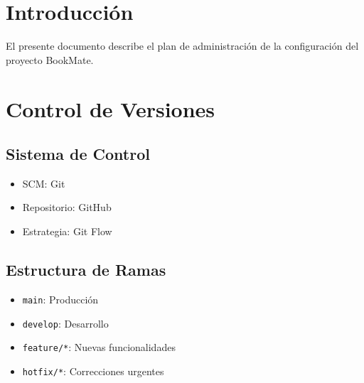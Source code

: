 
\def\docTitle{Plan de Administración de la Configuración}
\def\docSubtitle{Gestión de Versiones y Control de Cambios}
\def\docWeek{16}
\def\docVersion{1.0}





\makeUNIcover
\versionTable
\tableofcontents
\newpage

\section{Introducción}

El presente documento describe el plan de administración de la configuración del proyecto BookMate.

\section{Control de Versiones}

\subsection{Sistema de Control}
\begin{itemize}
    \item SCM: Git
    \item Repositorio: GitHub
    \item Estrategia: Git Flow
\end{itemize}

\subsection{Estructura de Ramas}

\begin{itemize}
    \item \texttt{main}: Producción
    \item \texttt{develop}: Desarrollo
    \item \texttt{feature/*}: Nuevas funcionalidades
    \item \texttt{hotfix/*}: Correcciones urgentes
\end{itemize}

